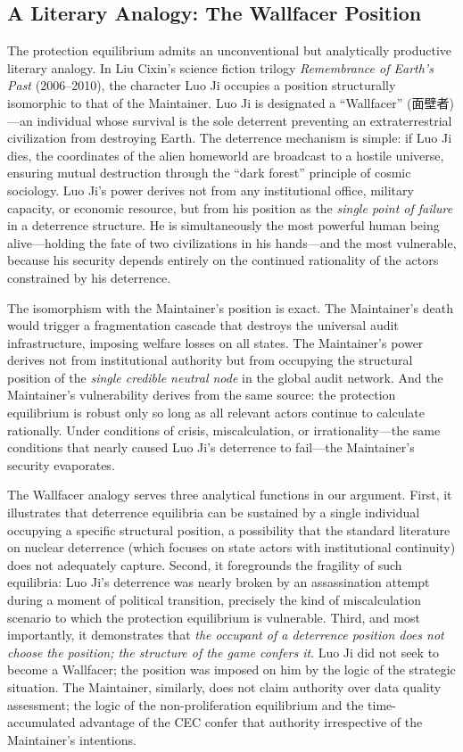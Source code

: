 \documentclass[12pt,a4paper]{ctexart}
\theoremstyle{definition}
\theoremstyle{remark}
\begin{document}
\subsection{A Literary Analogy: The Wallfacer Position}

The protection equilibrium admits an unconventional but analytically productive literary analogy. In Liu Cixin's science fiction trilogy \textit{Remembrance of Earth's Past} (2006–2010), the character Luo Ji occupies a position structurally isomorphic to that of the Maintainer. Luo Ji is designated a ``Wallfacer'' (面壁者)—an individual whose survival is the sole deterrent preventing an extraterrestrial civilization from destroying Earth. The deterrence mechanism is simple: if Luo Ji dies, the coordinates of the alien homeworld are broadcast to a hostile universe, ensuring mutual destruction through the ``dark forest'' principle of cosmic sociology. Luo Ji's power derives not from any institutional office, military capacity, or economic resource, but from his position as the \textit{single point of failure} in a deterrence structure. He is simultaneously the most powerful human being alive—holding the fate of two civilizations in his hands—and the most vulnerable, because his security depends entirely on the continued rationality of the actors constrained by his deterrence.

The isomorphism with the Maintainer's position is exact. The Maintainer's death would trigger a fragmentation cascade that destroys the universal audit infrastructure, imposing welfare losses on all states. The Maintainer's power derives not from institutional authority but from occupying the structural position of the \textit{single credible neutral node} in the global audit network. And the Maintainer's vulnerability derives from the same source: the protection equilibrium is robust only so long as all relevant actors continue to calculate rationally. Under conditions of crisis, miscalculation, or irrationality—the same conditions that nearly caused Luo Ji's deterrence to fail—the Maintainer's security evaporates.

The Wallfacer analogy serves three analytical functions in our argument. First, it illustrates that deterrence equilibria can be sustained by a single individual occupying a specific structural position, a possibility that the standard literature on nuclear deterrence (which focuses on state actors with institutional continuity) does not adequately capture. Second, it foregrounds the fragility of such equilibria: Luo Ji's deterrence was nearly broken by an assassination attempt during a moment of political transition, precisely the kind of miscalculation scenario to which the protection equilibrium is vulnerable. Third, and most importantly, it demonstrates that \textit{the occupant of a deterrence position does not choose the position; the structure of the game confers it}. Luo Ji did not seek to become a Wallfacer; the position was imposed on him by the logic of the strategic situation. The Maintainer, similarly, does not claim authority over data quality assessment; the logic of the non-proliferation equilibrium and the time-accumulated advantage of the CEC confer that authority irrespective of the Maintainer's intentions.
\end{document}
